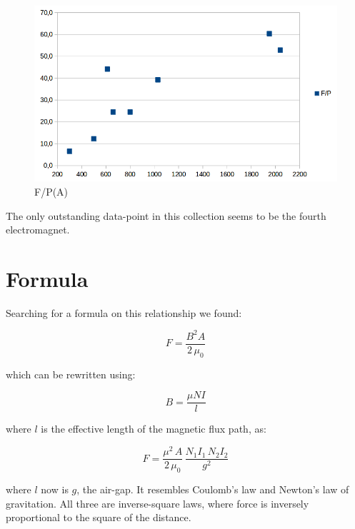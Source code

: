 \documentclass[]{elementary-physics}
\begin{document}
\begin{figure}[ht] \centering
	\includegraphics[scale=.4]{fp-of-a-2} \caption{F/P(A)}
\end{figure}

The only outstanding data-point in this collection seems to be the fourth electromagnet.


\section{Formula}

Searching for a formula on this relationship we found\cite{wpele,gbet}:

\begin{equation}
F = \frac{B^2 A}{2 \, \mu_0}
\end{equation}

which can be rewritten using:

\begin{equation}
B = \frac{\mu N I}{l}
\end{equation}

where $l$ is the effective length of the magnetic flux path, as\cite{wpele}:

\begin{equation}
F = \frac{\mu^2 \, A}{2 \, \mu_0} \, \frac{N_1 I_1 \, N_2 I_2}{g^2}
\end{equation}

where $l$ now is $g$, the air-gap.
It resembles Coulomb's law and Newton's law of gravitation.
All three are inverse-square laws, where force is inversely proportional to the square of the distance.
\end{document}
